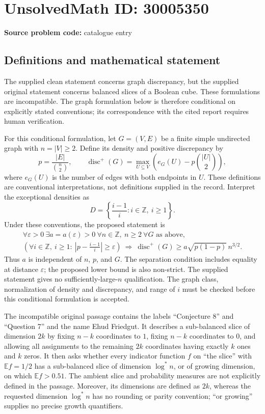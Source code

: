 \documentclass[11pt]{article}
\newcommand{\Z}{\mathbb{Z}}
\begin{document}
\section*{UnsolvedMath ID: 30005350}
\textbf{Source problem code:} catalogue entry
\subsection{Definitions and mathematical statement}
The supplied clean statement concerns graph discrepancy, but the supplied original statement concerns balanced slices of a Boolean cube. These formulations are incompatible. The graph formulation below is therefore conditional on explicitly stated conventions; its correspondence with the cited report requires human verification.

For this conditional formulation, let \(G=(V,E)\) be a finite simple undirected graph with \(n=|V|\geq 2\). Define its density and positive discrepancy by
\[
p=\frac{|E|}{\binom{n}{2}},\qquad
\operatorname{disc}^{+}(G)=\max_{U\subseteq V}\left(e_G(U)-p\binom{|U|}{2}\right),
\]
where \(e_G(U)\) is the number of edges with both endpoints in \(U\). These definitions are conventional interpretations, not definitions supplied in the record. Interpret the exceptional densities as
\[
D=\left\{\frac{i-1}{i}:i\in\Z,\ i\geq 1\right\}.
\]
Under these conventions, the proposed statement is
\[
\begin{gathered}
\forall\varepsilon>0\ \exists a=a(\varepsilon)>0\ \forall n\in\Z,\ n\geq2\ \forall G\text{ as above},\\
\left(\forall i\in\Z,\ i\geq1:\ \left|p-\frac{i-1}{i}\right|\geq\varepsilon\right)
\ \Longrightarrow\
\operatorname{disc}^{+}(G)\geq a\sqrt{p(1-p)}\,n^{3/2}.
\end{gathered}
\]
Thus \(a\) is independent of \(n\), \(p\), and \(G\). The separation condition includes equality at distance \(\varepsilon\); the proposed lower bound is also non-strict. The supplied statement gives no sufficiently-large-\(n\) qualification. The graph class, normalization of density and discrepancy, and range of \(i\) must be checked before this conditional formulation is accepted.

The incompatible original passage contains the labels ``Conjecture 8'' and ``Question 7'' and the name Ehud Friedgut. It describes a sub-balanced slice of dimension \(2k\) by fixing \(n-k\) coordinates to \(1\), fixing \(n-k\) coordinates to \(0\), and allowing all assignments to the remaining \(2k\) coordinates having exactly \(k\) ones and \(k\) zeros. It then asks whether every indicator function \(f\) on ``the slice'' with \(\mathbb E f=1/2\) has a sub-balanced slice of dimension \(\log^{*}n\), or of growing dimension, on which \(\mathbb E f>0.51\). The ambient slice and probability measures are not explicitly defined in the passage. Moreover, its dimensions are defined as \(2k\), whereas the requested dimension \(\log^{*}n\) has no rounding or parity convention; ``or growing'' supplies no precise growth quantifiers.
\end{document}
